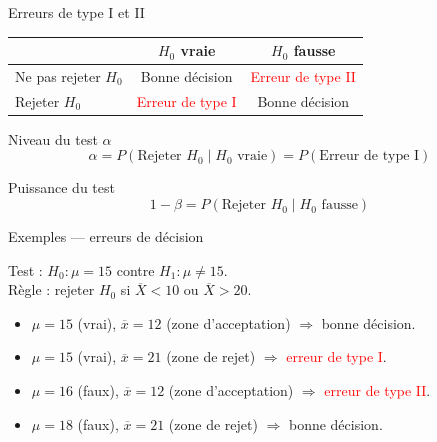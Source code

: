 \documentclass{BeamerTemplate}
\begin{document}
\begin{frame}[t]{Erreurs de type I et II}

\begin{center}
\begin{tabular}{l|cc}\hline
 & $H_0$ vraie & $H_0$ fausse \\ \hline
Ne pas rejeter $H_0$ & \textcolor{green!60!black}{Bonne décision} & \textcolor{red}{Erreur de type II} \\[4pt]
Rejeter $H_0$ & \textcolor{red}{Erreur de type I} & \textcolor{green!60!black}{Bonne décision} \\ \hline
\end{tabular}
\end{center}

\medskip
\begin{Boite}{Niveau du test $\alpha$}
$$\alpha = P(\text{Rejeter }H_0 \mid H_0 \text{ vraie}) = P(\text{Erreur de type I})$$
\end{Boite}

\begin{Boite}{Puissance du test}
$$1-\beta = P(\text{Rejeter }H_0 \mid H_0 \text{ fausse})$$
\end{Boite}

\end{frame}

\begin{frame}[t]{Exemples — erreurs de décision}

Test : $H_0 : \mu = 15$ contre $H_1 : \mu \ne 15$.\\
Règle : rejeter $H_0$ si $\overline{X} < 10$ ou $\overline{X} > 20$.

\bigskip
\begin{itemize}\itemsep6mm
  \item $\mu = 15$ (vrai), $\overline{x} = 12$ (zone d'acceptation) $\Rightarrow$ \textcolor{green!60!black}{bonne décision}.
  \item $\mu = 15$ (vrai), $\overline{x} = 21$ (zone de rejet) $\Rightarrow$ \textcolor{red}{erreur de type I}.
  \item $\mu = 16$ (faux), $\overline{x} = 12$ (zone d'acceptation) $\Rightarrow$ \textcolor{red}{erreur de type II}.
  \item $\mu = 18$ (faux), $\overline{x} = 21$ (zone de rejet) $\Rightarrow$ \textcolor{green!60!black}{bonne décision}.
\end{itemize}

\end{frame}

\end{document}
